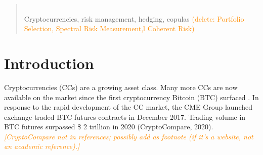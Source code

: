 \documentclass[11pt,a4paper,english]{article}
\providecommand{\natp}[1]{\textcolor{darkorange}{#1}}
\begin{document}
\begin{abstract}
{  \\
 Cryptocurrencies, risk management, hedging,
copulas \natp{(delete: Portfolio Selection, Spectral Risk Measurement,l Coherent Risk)}}
\pagestyle{empty}
\end{abstract}




\clearpage

\tableofcontents

\clearpage
\section{Introduction}\label{sec:introduction}
Cryptocurrencies (CCs) are a growing asset class.
Many more CCs are now available on the market since the first
cryptocurrency Bitcoin (BTC) surfaced \citep{nakamoto2009}.
In response to the rapid development of the CC market, the CME Group
launched exchange-traded BTC futures contracts in December
2017. Trading volume in BTC futures surpassed \$ 2 trillion in 2020
(CryptoCompare, 2020). \natp{\em[CryptoCompare not in references;
  possibly add as footnote (if it's a website, not an academic
  reference).]} 
\end{document}
